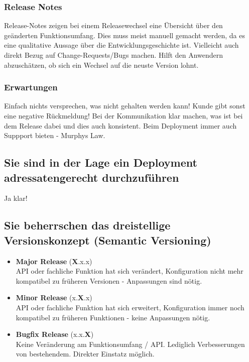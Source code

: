 \subsubsection{Release Notes}
Release-Notes zeigen bei einem Releasewechsel eine Übersicht über den geänderten Funktionsumfang. Dies muss meist manuell gemacht werden, da es eine qualitative Aussage über die Entwicklungsgeschichte ist. Vielleicht auch direkt Bezug auf Change-Requests/Bugs machen. Hilft den Anwendern abzuschätzen, ob sich ein Wechsel auf die neuste Version lohnt.

\subsubsection{Erwartungen}
Einfach nichts versprechen, was nicht gehalten werden kann! Kunde gibt sonst eine negative Rückmeldung! Bei der Kommunikation klar machen, was ist bei dem Release dabei und dies auch konsistent. Beim Deployment immer auch Suppport bieten - Murphys Law.

\subsection{Sie sind in der Lage ein Deployment adressatengerecht durchzuführen}
Ja klar!

\subsection{Sie beherrschen das dreistellige Versionskonzept (Semantic Versioning)}
\begin{itemize}
  \item \textbf{Major Release} (\textbf{X}.x.x)\\
  API oder fachliche Funktion hat sich verändert, Konfiguration nicht mehr kompatibel zu früheren Versionen - Anpassungen sind nötig.
  \item \textbf{Minor Release} (x.\textbf{X}.x)\\
  API oder fachliche Funktion hat sich erweitert, Konfiguration immer noch kompatibel zu früheren Funktionen - keine Anpassungen nötig.
  \item \textbf{Bugfix Release} (x.x.\textbf{X})\\
  Keine Veränderung am Funktionsumfang / API. Lediglich Verbesserungen von bestehendem. Direkter Einstatz möglich.
  
\end{itemize}

